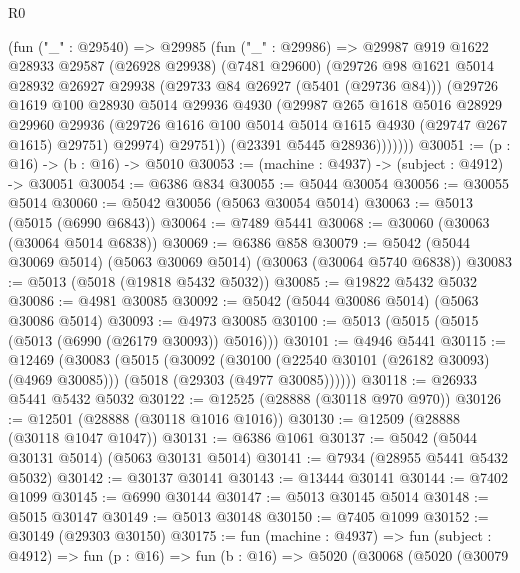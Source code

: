 \begin{lexlean}{R0}
\begin{coremodule}
            (fun ("_" : @29540) =>
            @29985
              (fun ("_" : @29986) =>
              @29987
                @919
                @1622
                @28933
                @29587
                (@26928 @29938)
                (@7481 @29600)
                (@29726
                  @98
                  @1621
                  @5014
                  @28932
                  @26927
                  @29938
                  (@29733 @84 @26927 (@5401 (@29736 @84)))
                  (@29726
                    @1619
                    @100
                    @28930
                    @5014
                    @29936
                    @4930
                    (@29987
                      @265
                      @1618
                      @5016
                      @28929
                      @29960
                      @29936
                      (@29726 @1616 @100 @5014 @5014 @1615 @4930 (@29747 @267 @1615) @29751)
                      @29974)
                    @29751))
                (@23391 @5445 @28936)))))))
@30051 := (p : @16) -> (b : @16) -> @5010
@30053 := (machine : @4937) -> (subject : @4912) -> @30051
@30054 := @6386 @834
@30055 := @5044 @30054
@30056 := @30055 @5014
@30060 := @5042 @30056 (@5063 @30054 @5014)
@30063 := @5013 (@5015 (@6990 @6843))
@30064 := @7489 @5441
@30068 := @30060 (@30063 (@30064 @5014 @6838))
@30069 := @6386 @858
@30079 := @5042 (@5044 @30069 @5014) (@5063 @30069 @5014) (@30063 (@30064 @5740 @6838))
@30083 := @5013 (@5018 (@19818 @5432 @5032))
@30085 := @19822 @5432 @5032
@30086 := @4981 @30085
@30092 := @5042 (@5044 @30086 @5014) (@5063 @30086 @5014)
@30093 := @4973 @30085
@30100 := @5013 (@5015 (@5015 (@5013 (@6990 (@26179 @30093)) @5016)))
@30101 := @4946 @5441
@30115 := @12469
    (@30083
      (@5015
        (@30092
          (@30100 (@22540 @30101 (@26182 @30093) (@4969 @30085)))
          (@5018 (@29303 (@4977 @30085))))))
@30118 := @26933 @5441 @5432 @5032
@30122 := @12525 (@28888 (@30118 @970 @970))
@30126 := @12501 (@28888 (@30118 @1016 @1016))
@30130 := @12509 (@28888 (@30118 @1047 @1047))
@30131 := @6386 @1061
@30137 := @5042 (@5044 @30131 @5014) (@5063 @30131 @5014)
@30141 := @7934 (@28955 @5441 @5432 @5032)
@30142 := @30137 @30141
@30143 := @13444 @30141
@30144 := @7402 @1099
@30145 := @6990 @30144
@30147 := @5013 @30145 @5014
@30148 := @5015 @30147
@30149 := @5013 @30148
@30150 := @7405 @1099
@30152 := @30149 (@29303 @30150)
@30175 := fun (machine : @4937) =>
  fun (subject : @4912) =>
  fun (p : @16) =>
  fun (b : @16) =>
  @5020
    (@30068
      (@5020
        (@30079

\end{coremodule}
\end{lexlean}
